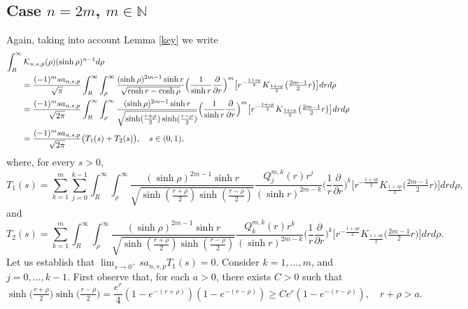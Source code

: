 \documentclass[a4paper,10pt, reqno]{amsart}
\theoremstyle{definition}
\theoremstyle{remark}
\numberwithin{equation}{section}
\begin{document}
{\subsection{Case $n=2m$, $m\in \mathbb N$}\label{Seven} Again, taking into account Lemma \ref{key} we write
\begin{align}\label{S1S2even}
    \int_R^\infty \mathcal K_{n,s,p}(\rho )(\sinh \rho )^{n-1}d\rho\\
    &\hspace{-3.5cm}=\frac{(-1)^msa_{n,s,p}}{\sqrt{\pi}}\int_R^\infty\int_\rho ^\infty \frac{(\sinh \rho )^{2m-1}\sinh r}{\sqrt{\cosh r-\cosh \rho}}\Big(\frac{1}{\sinh r }\frac{\partial }{\partial r}\Big)^m\big[r ^{-\frac{1+sp}{2}}K_{\frac{1+sp}{2}}\big(\tfrac{2m-1}{2}r\big)\big]drd\rho \nonumber\\
    &\hspace{-3.5cm}=\frac{(-1)^msa_{n,s,p}}{\sqrt{2\pi}}\int_R^\infty\int_\rho ^\infty \frac{(\sinh \rho )^{2m-1}\sinh r}{\sqrt{\sinh (\frac{r+\rho}{2})\sinh (\frac{r-\rho }{2})}}\Big(\frac{1}{\sinh r }\frac{\partial }{\partial r}\Big)^m\big[r ^{-\frac{1+sp}{2}}K_{\frac{1+sp}{2}}\big(\tfrac{2m-1}{2}r\big)\big]drd\rho \nonumber\\
    &\hspace{-3.5cm}=\frac{(-1)^msa_{n,s,p}}{\sqrt{2\pi}} \big(T_1(s)+T_2(s)\big),\quad s\in (0,1),\nonumber
    \end{align}
where, for every $s>0$, 
$$
T_1(s)=\sum_{k=1}^m\sum_{j=0}^{k-1}\int_R^\infty \int_\rho ^\infty  \frac{(\sinh \rho )^{2m-1}\sinh r}{\sqrt{\sinh (\frac{r+\rho}{2})\sinh (\frac{r-\rho }{2})}}\frac{Q_j^{m,k}(r)r^j}{(\sinh r)^{2m-k}}\Big(\frac{1}{r}\frac{\partial }{\partial r}\Big)^k\big[r ^{-\frac{1+sp}{2}}K_{\frac{1+sp}{2}}\big(\tfrac{2m-1}{2}r\big)\big]drd\rho,
$$
and
$$
T_2(s)=\sum_{k=1}^m\int_R^\infty \int_\rho ^\infty \frac{(\sinh \rho )^{2m-1}\sinh r}{\sqrt{\sinh (\frac{r+\rho}{2})\sinh (\frac{r-\rho }{2})}}\frac{Q_k^{m,k}(r)r^k}{(\sinh r)^{2m-k}}\Big(\frac{1}{r}\frac{\partial }{\partial r}\Big)^k\big[r ^{-\frac{1+sp}{2}}K_{\frac{1+sp}{2}}\big(\tfrac{2m-1}{2}r\big)\big]drd\rho.
$$
Let us establish that $\lim_{s\rightarrow 0^+}sa_{n,s,p}T_1(s)=0$. Consider $k=1,\ldots, m$, and $j=0,\ldots, k-1$. First observe that, for each $a>0$, there exists $C>0$ such that  
\begin{equation}\label{sinsin}
\sinh \big(\tfrac{r+\rho}{2}\big)\sinh \big(\tfrac{r-\rho }{2}\big)=\frac{e^r}{4}(1-e^{-(r+\rho)})(1-e^{-(r-\rho )})\geq Ce^r(1-e^{-(r-\rho )}), \quad r+\rho >a.
\end{equation}
}
\end{document}
